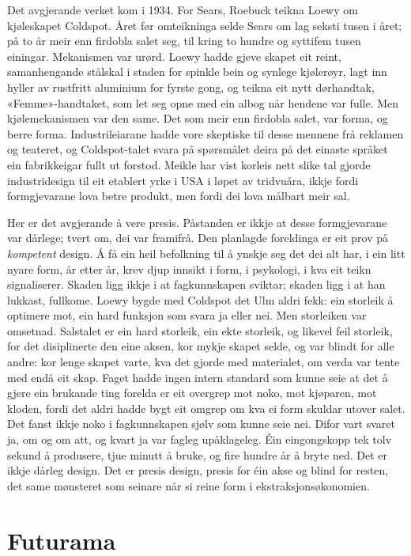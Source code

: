 Det avgjerande verket kom i 1934. For Sears, Roebuck teikna Loewy om kjøleskapet Coldspot. Året før omteikninga selde Sears om lag seksti tusen i året; på to år meir enn firdobla salet seg, til kring to hundre og syttifem tusen einingar\autocite{meikle1979}. Mekanismen var urørd. Loewy hadde gjeve skapet eit reint, samanhengande stålskal i staden for spinkle bein og synlege kjølerøyr, lagt inn hyller av rustfritt aluminium for fyrste gong, og teikna eit nytt dørhandtak, «Femme»-handtaket, som let seg opne med ein albog når hendene var fulle. Men kjølemekanismen var den same. Det som meir enn firdobla salet, var forma, og berre forma. Industrileiarane hadde vore skeptiske til desse mennene frå reklamen og teateret, og Coldspot-talet svara på spørsmålet deira på det einaste språket ein fabrikkeigar fullt ut forstod. Meikle har vist korleis nett slike tal gjorde industridesign til eit etablert yrke i USA i løpet av tridvuåra, ikkje fordi formgjevarane lova betre produkt, men fordi dei lova målbart meir sal\autocite{meikle1979}.

Her er det avgjerande å vere presis. Påstanden er ikkje at desse formgjevarane var dårlege; tvert om, dei var framifrå. Den planlagde foreldinga er eit prov på \emph{kompetent} design. Å få ein heil befolkning til å ynskje seg det dei alt har, i ein litt nyare form, år etter år, krev djup innsikt i form, i psykologi, i kva eit teikn signaliserer. Skaden ligg ikkje i at fagkunnskapen sviktar; skaden ligg i at han lukkast, fullkome. Loewy bygde med Coldspot det Ulm aldri fekk: ein storleik å optimere mot, ein hard funksjon som svara ja eller nei. Men storleiken var omsetnad. Salstalet er ein hard storleik, ein ekte storleik, og likevel feil storleik, for det disiplinerte den eine aksen, kor mykje skapet selde, og var blindt for alle andre: kor lenge skapet varte, kva det gjorde med materialet, om verda var tente med endå eit skap. Faget hadde ingen intern standard som kunne seie at det å gjere ein brukande ting forelda er eit overgrep mot noko, mot kjøparen, mot kloden, fordi det aldri hadde bygt eit omgrep om kva ei form skuldar utover salet. Det fanst ikkje noko i fagkunnskapen sjølv som kunne seie nei. Difor vart svaret ja, om og om att, og kvart ja var fagleg upåklageleg. Éin eingongskopp tek tolv sekund å produsere, tjue minutt å bruke, og fire hundre år å bryte ned. Det er ikkje dårleg design. Det er presis design, presis for éin akse og blind for resten, det same mønsteret som seinare når si reine form i ekstraksjonsøkonomien.

\section{Futurama}

